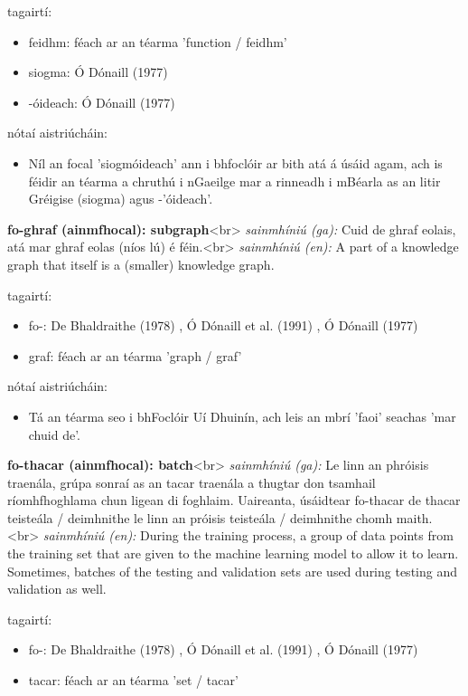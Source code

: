 \documentclass{article}
\begin{document}
tagairtí:
\begin{itemize}
	\item feidhm: féach ar an téarma 'function / feidhm'
	\item siogma: Ó Dónaill (1977) \cite{odonaill}
	\item -óideach: Ó Dónaill (1977) \cite{odonaill}
\end{itemize}

nótaí aistriúcháin:
\begin{itemize}
	\item Níl an focal 'siogmóideach' ann i bhfoclóir ar bith atá á úsáid agam, ach is féidir an téarma a chruthú i nGaeilge mar a rinneadh i mBéarla as an litir Gréigise (siogma) agus -'óideach'.
\end{itemize}


\textbf{fo-ghraf (ainmfhocal): subgraph}<br>
\textit{sainmhíniú (ga):} Cuid de ghraf eolais, atá mar ghraf eolas (níos lú) é féin.<br>
\textit{sainmhíniú (en):} A part of a knowledge graph that itself is a (smaller) knowledge graph.

tagairtí:
\begin{itemize}
	\item fo-: De Bhaldraithe (1978) \cite{de-bhaldraithe}, Ó Dónaill et al. (1991) \cite{focloir-beag}, Ó Dónaill (1977) \cite{odonaill}
	\item graf: féach ar an téarma 'graph / graf'
\end{itemize}

nótaí aistriúcháin:
\begin{itemize}
	\item Tá an téarma seo i bhFoclóir Uí Dhuinín, ach leis an mbrí 'faoi' seachas 'mar chuid de'.
\end{itemize}


\textbf{fo-thacar (ainmfhocal): batch}<br>
\textit{sainmhíniú (ga):} Le linn an phróisis traenála, grúpa sonraí as an tacar traenála a thugtar don tsamhail ríomhfhoghlama chun ligean di foghlaim. Uaireanta, úsáidtear fo-thacar de thacar teisteála / deimhnithe le linn an próisis teisteála / deimhnithe chomh maith.<br>
\textit{sainmhíniú (en):} During the training process, a group of data points from the training set that are given to the machine learning model to allow it to learn. Sometimes, batches of the testing and validation sets are used during testing and validation as well.

tagairtí:
\begin{itemize}
	\item fo-: De Bhaldraithe (1978) \cite{de-bhaldraithe}, Ó Dónaill et al. (1991) \cite{focloir-beag}, Ó Dónaill (1977) \cite{odonaill}
	\item tacar: féach ar an téarma 'set / tacar'
\end{itemize}
\end{document}
